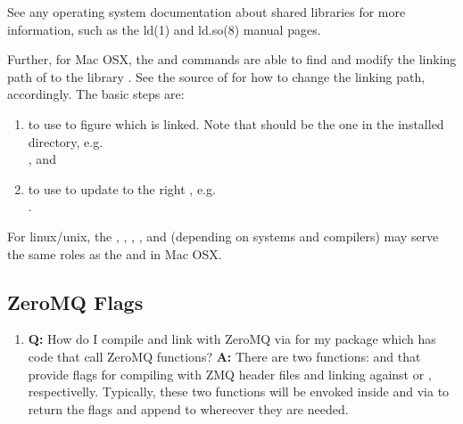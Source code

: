 \begin{enumerate}
\begin{Code}
See any operating system documentation about shared libraries for
more information, such as the ld(1) and ld.so(8) manual pages.
\end{Code}
    Further, for Mac OSX, the  and 
    commands are able to find and modify the linking path of 
    to the library .
    See the source of
     for how to change the linking path,
    accordingly. The basic steps are:
    \begin{enumerate}
    \item to use  to figure which
           is linked. Note that 
          should be the one in the installed directory, e.g. \\
          ,
          and
    \item to use 
          to update to the right , e.g. \\
          .
    \end{enumerate}
    For linux/unix, the , , ,
    , and  (depending on systems and
    compilers) may serve the same roles as the  and
     in Mac OSX.
\end{enumerate}




\subsection[ZeroMQ Flags]{ZeroMQ Flags}
\label{sec:zmq_flags}


\begin{enumerate}
\item {\bf\color{blue} Q:}
      How do I compile and link with ZeroMQ via  for my package
      which has  code that call ZeroMQ functions?
      {\bf\color{blue} A:}
      There are two  functions:  and
       that provide flags for compiling
      with ZMQ header files and linking against  or
      , respectivelly.
      Typically, these two functions will be envoked inside 
      and  via  to return the flags
      and append to whereever they are needed.

\end{enumerate}

